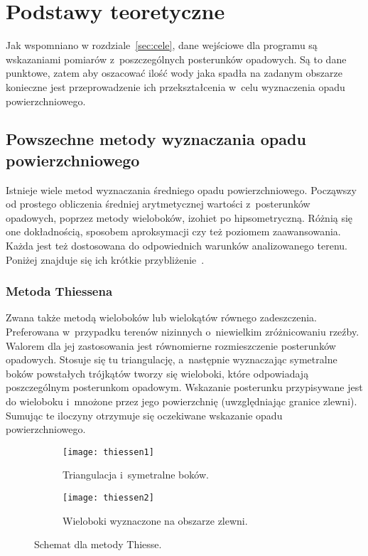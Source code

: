 \chapter{Podstawy teoretyczne}
Jak wspomniano w rozdziale~\ref{sec:cele}, dane wejściowe dla programu są wskazaniami pomiarów z~poszczególnych posterunków opadowych. Są to dane punktowe, zatem aby oszacować ilość wody jaka spadła na zadanym obszarze konieczne jest przeprowadzenie ich przekształcenia w~celu wyznaczenia opadu powierzchniowego.

\section{Powszechne metody wyznaczania opadu powierzchniowego}

Istnieje wiele metod wyznaczania średniego opadu powierzchniowego. Począwszy od prostego obliczenia średniej arytmetycznej wartości z~posterunków opadowych, poprzez metody wieloboków, izohiet po hipsometryczną. Różnią się one dokładnością, sposobem aproksymacji czy też poziomem zaawansowania. Każda jest też dostosowana do odpowiednich warunków analizowanego terenu. Poniżej znajduje się ich krótkie przybliżenie~\cite{obliczanie_opadu_sredniego, metody_obliczania_pb, opad_metody}.

\subsection{Metoda Thiessena}
Zwana także metodą wieloboków lub wielokątów równego zadeszczenia. Preferowana w~przypadku terenów nizinnych o~niewielkim zróżnicowaniu rzeźby. Walorem dla jej zastosowania jest równomierne rozmieszczenie posterunków opadowych. Stosuje się tu triangulację, a~następnie wyznaczając symetralne boków powstałych trójkątów tworzy się wieloboki, które odpowiadają poszczególnym posterunkom opadowym. Wskazanie posterunku przypisywane jest do wieloboku i~mnożone przez jego powierzchnię (uwzględniając granice zlewni). Sumując te iloczyny otrzymuje się oczekiwane wskazanie opadu powierzchniowego.

\begin{figure}[!ht]
	\begin{subfigure}{.5\textwidth}
		\centering
		\texttt{[image: thiessen1]}
		\caption{Triangulacja i~symetralne boków.}
	\end{subfigure}%
	\begin{subfigure}{.5\textwidth}
		\centering
		\texttt{[image: thiessen2]}
		\caption{Wieloboki wyznaczone na obszarze zlewni.}
	\end{subfigure}	
\caption{Schemat dla metody Thiesse. }
\end{figure}

